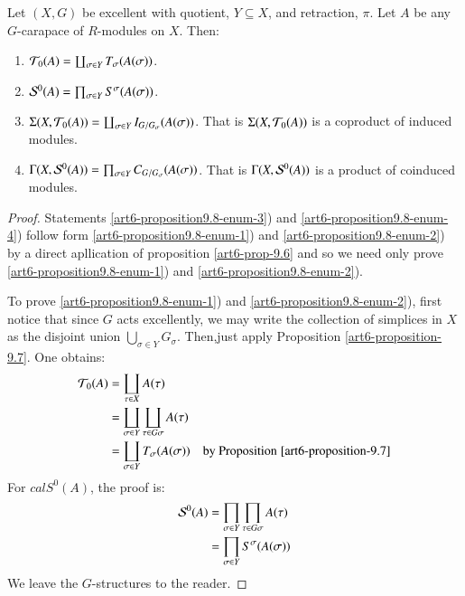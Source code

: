 \begin{prop}\label{art6-proposition-9.8}
Let $(X, G)$ be excellent with quotient, $Y \subseteq X$, and retraction, $\pi$. Let $A$ be any $G$-carapace of $R$-modules on $X$. Then:
\begin{enumerate}[(1)]
\item $\mathcal{T}_{0}(A)= \coprod_{\sigma \in Y}T_{\sigma}(A(\sigma))$.\label{art6-proposition9.8-enum-1}
\item $\mathcal{S}^{0}(A) = \prod_{\sigma \in Y} S^{\sigma}(A(\sigma))$.\label{art6-proposition9.8-enum-2}
\item $\Sigma(X, \mathcal{T}_{0}(A)) = \coprod_{\sigma \in Y} I_{G/G_{\sigma}}(A(\sigma))$. That is $\Sigma(X, \mathcal{T}_{0}(A))$ is a coproduct of induced modules.\label{art6-proposition9.8-enum-3}
\item $\Gamma(X, \mathcal{S}^{0}(A))= \prod_{\sigma \in Y}C_{G/G_{\sigma}}(A(\sigma))$. That is $\Gamma(X, \mathcal{S}^{0}(A))$ is a product of coinduced modules. \label{art6-proposition9.8-enum-4}
\end{enumerate}
\end{prop}

\begin{proof}
Statements \ref{art6-proposition9.8-enum-3}) and \ref{art6-proposition9.8-enum-4}) follow form \ref{art6-proposition9.8-enum-1}) and  \ref{art6-proposition9.8-enum-2}) by a direct apllication of proposition \ref{art6-prop-9.6} and so we need only prove \ref{art6-proposition9.8-enum-1})  and \ref{art6-proposition9.8-enum-2}).

To prove \ref{art6-proposition9.8-enum-1}) and \ref{art6-proposition9.8-enum-2}), first notice that since $G$ acts excellently, we may write the collection of simplices in $X$ as the disjoint union $\bigcup_{\sigma \in Y}G_{\sigma}$. Then,just apply Proposition \ref{art6-proposition-9.7}. One obtains:
\begin{align*}
\mathcal{T}_{0}(A) &= \coprod_{\tau \in X}A(\tau)\\
& = \coprod_{\sigma \in Y} \coprod_{\tau \in G\sigma}A(\tau)\\
 & = \coprod_{\sigma \in Y} T_{\sigma}(A(\sigma)) \quad \text{by Proposition}\; \ref{art6-proposition-9.7}
\end{align*}
For $calS^{0}(A)$, the proof is:
\begin{align*}
\mathcal{S}^{0}(A) &= \prod_{\sigma \in Y} \prod_{\tau \in G\sigma}A(\tau)\\
& = \prod_{\sigma \in Y}S^{\sigma}(A(\sigma))
\end{align*}
We leave the $G$-structures to the reader.
\end{proof}

